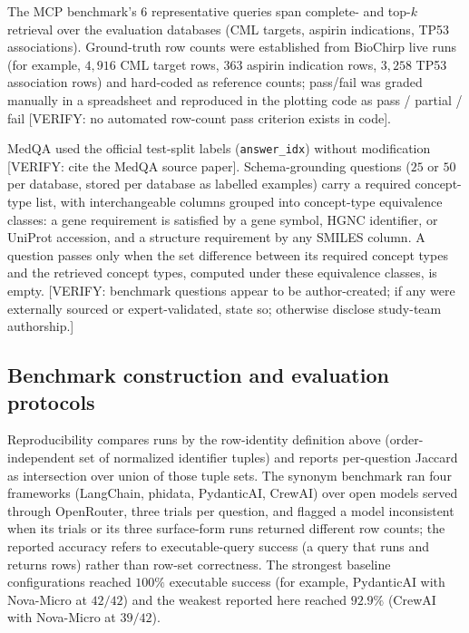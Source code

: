 The MCP benchmark's $6$ representative queries span complete- and top-$k$ retrieval over the evaluation databases (CML targets, aspirin indications, TP53 associations). Ground-truth row counts were established from BioChirp live runs (for example, $4{,}916$ CML target rows, $363$ aspirin indication rows, $3{,}258$ TP53 association rows) and hard-coded as reference counts; pass/fail was graded manually in a spreadsheet and reproduced in the plotting code as pass / partial / fail [VERIFY: no automated row-count pass criterion exists in code].

MedQA used the official test-split labels (\texttt{answer\_idx}) without modification [VERIFY: cite the MedQA source paper]. Schema-grounding questions ($25$ or $50$ per database, stored per database as labelled examples) carry a required concept-type list, with interchangeable columns grouped into concept-type equivalence classes: a gene requirement is satisfied by a gene symbol, HGNC identifier, or UniProt accession, and a structure requirement by any SMILES column. A question passes only when the set difference between its required concept types and the retrieved concept types, computed under these equivalence classes, is empty. [VERIFY: benchmark questions appear to be author-created; if any were externally sourced or expert-validated, state so; otherwise disclose study-team authorship.]

\subsection*{Benchmark construction and evaluation protocols}

Reproducibility compares runs by the row-identity definition above (order-independent set of normalized identifier tuples) and reports per-question Jaccard as intersection over union of those tuple sets. The synonym benchmark ran four frameworks (LangChain, phidata, PydanticAI, CrewAI) over open models served through OpenRouter, three trials per question, and flagged a model inconsistent when its trials or its three surface-form runs returned different row counts; the reported accuracy refers to executable-query success (a query that runs and returns rows) rather than row-set correctness. The strongest baseline configurations reached $100\%$ executable success (for example, PydanticAI with Nova-Micro at $42/42$) and the weakest reported here reached $92.9\%$ (CrewAI with Nova-Micro at $39/42$).

